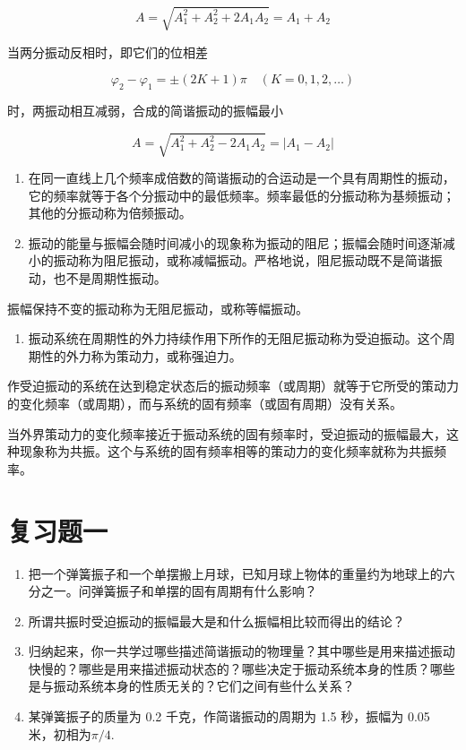 \[
A = \sqrt {A _ {1} ^ {2} + A _ {2} ^ {2} + 2 A _ {1} A _ {2}} = A _ {1} + A _ {2}
\]

当两分振动反相时，即它们的位相差

\[
\varphi_ {2} - \varphi_ {1} = \pm (2 K + 1) \pi \quad (K = 0, 1, 2, \dots)
\]

时，两振动相互减弱，合成的简谐振动的振幅最小

\[
A = \sqrt {A _ {1} ^ {2} + A _ {2} ^ {2} - 2 A _ {1} A _ {2}} = | A _ {1} - A _ {2} |
\]

\begin{enumerate}
\def\labelenumi{\arabic{enumi}.}
\setcounter{enumi}{7}
\item
  在同一直线上几个频率成倍数的简谐振动的合运动是一个具有周期性的振动，它的频率就等于各个分振动中的最低频率。频率最低的分振动称为基频振动；其他的分振动称为倍频振动。
\item
  振动的能量与振幅会随时间减小的现象称为振动的阻尼；振幅会随时间逐渐减小的振动称为阻尼振动，或称减幅振动。严格地说，阻尼振动既不是简谐振动，也不是周期性振动。
\end{enumerate}

振幅保持不变的振动称为无阻尼振动，或称等幅振动。

\begin{enumerate}
\def\labelenumi{\arabic{enumi}.}
\setcounter{enumi}{9}
\tightlist
\item
  振动系统在周期性的外力持续作用下所作的无阻尼振动称为受迫振动。这个周期性的外力称为策动力，或称强迫力。
\end{enumerate}

作受迫振动的系统在达到稳定状态后的振动频率（或周期）就等于它所受的策动力的变化频率（或周期），而与系统的固有频率（或固有周期）没有关系。

当外界策动力的变化频率接近于振动系统的固有频率时，受迫振动的振幅最大，这种现象称为共振。这个与系统的固有频率相等的策动力的变化频率就称为共振频率。

\section{复习题一}\label{ux590dux4e60ux9898ux4e00}

\begin{enumerate}
\def\labelenumi{\arabic{enumi}.}
\item
  把一个弹簧振子和一个单摆搬上月球，已知月球上物体的重量约为地球上的六分之一。问弹簧振子和单摆的固有周期有什么影响？
\item
  所谓共振时受迫振动的振幅最大是和什么振幅相比较而得出的结论？
\item
  归纳起来，你一共学过哪些描述简谐振动的物理量？其中哪些是用来描述振动快慢的？哪些是用来描述振动状态的？哪些决定于振动系统本身的性质？哪些是与振动系统本身的性质无关的？它们之间有些什么关系？
\item
  某弹簧振子的质量为 0.2 千克，作简谐振动的周期为 1.5 秒，振幅为 0.05
  米，初相为\(\pi / 4\).
\end{enumerate}

